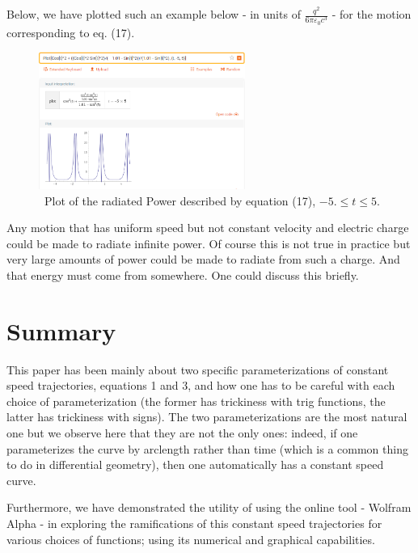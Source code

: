 \documentclass[journal]{IEEEtran}
\begin{document}
Below, we have plotted such an example below - in units of ${\frac {q^{2}}{6\pi \varepsilon _{0}c^{3}}}$ - for the motion corresponding to eq. (17).
\begin{figure}[H]
\includegraphics[width=6.75cm]{FIG14.PNG}
\caption{\ Plot of the radiated Power described by equation (17), $ -5. \leq t \leq 5. $\bigskip}
\centering
\end{figure}
%
%
Any motion that has uniform speed but not constant velocity and electric charge could be made to radiate infinite power.  Of course this is not true in practice but very large amounts of power could be made to radiate from such a charge.  And that energy must come from somewhere.  One could discuss this briefly. 

\section{\bf\large Summary}
\par This paper has been mainly about two specific parameterizations of constant speed trajectories, equations 1 and 3, and how one has to be careful with each choice of parameterization (the former has trickiness with trig functions, the latter has trickiness with signs). The two parameterizations are the most natural one but we observe here that they are not the only ones: indeed, if one parameterizes the curve by arclength rather than time (which is a common thing to do in differential geometry), then one automatically has a constant speed curve.

\par Furthermore, we have demonstrated the utility of using the online tool - Wolfram Alpha - in exploring the ramifications of this constant speed trajectories for various choices of functions; using its numerical and graphical capabilities.
\end{document}
